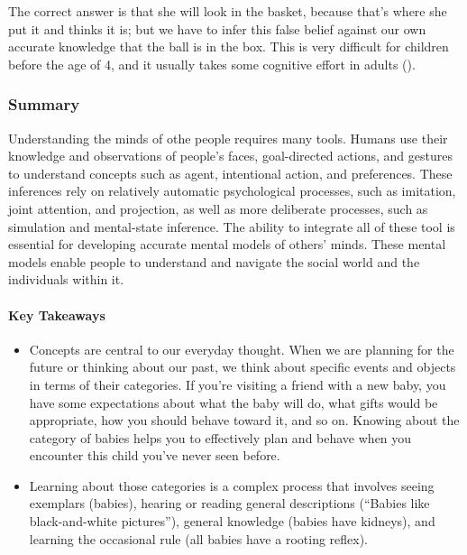 \documentclass[
]{krantz}
\providecommand{\tightlist}{%
  \setlength{\itemsep}{0pt}\setlength{\parskip}{0pt}}
\begin{document}
The correct answer is that she will look in the basket, because that's where she put it and thinks it is; but we have to infer this false belief against our own accurate knowledge that the ball is in the box. This is very difficult for children before the age of 4, and it usually takes some cognitive effort in adults ().

\subsubsection*{Summary}\label{summary}


Understanding the minds of othe people requires many tools. Humans use their knowledge and observations of people's faces, goal-directed actions, and gestures to understand concepts such as agent, intentional action, and preferences. These inferences rely on relatively automatic psychological processes, such as imitation, joint attention, and projection, as well as more deliberate processes, such as simulation and mental-state inference. The ability to integrate all of these tool is essential for developing accurate mental models of others' minds. These mental models enable people to understand and navigate the social world and the individuals within it.

\paragraph*{Key Takeaways}\label{key-takeaways-6}

\begin{itemize}
\tightlist
\item
  Concepts are central to our everyday thought. When we are planning for the future or thinking about our past, we think about specific events and objects in terms of their categories. If you're visiting a friend with a new baby, you have some expectations about what the baby will do, what gifts would be appropriate, how you should behave toward it, and so on. Knowing about the category of babies helps you to effectively plan and behave when you encounter this child you've never seen before.
\item
  Learning about those categories is a complex process that involves seeing exemplars (babies), hearing or reading general descriptions (``Babies like black-and-white pictures''), general knowledge (babies have kidneys), and learning the occasional rule (all babies have a rooting reflex).
\end{itemize}
\end{document}
